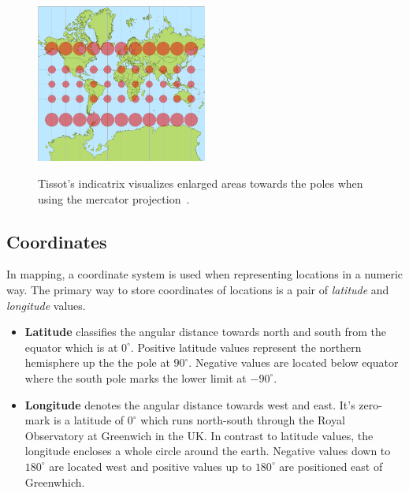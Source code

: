 \begin{figure}[h]
  \begin{center}
    \includegraphics[width=0.5\textwidth]{figures/tissot_mercator.png}
    \label{fig:mercator}
    \caption{Tissot's indicatrix visualizes enlarged areas towards the poles when using the mercator projection~\cite{wiki:mercator}.}
  \end{center}
\end{figure}


\subsection{Coordinates}

In mapping, a coordinate system is used when representing locations in a numeric way. The primary way to store coordinates of locations is a pair of \textit{latitude} and \textit{longitude} values. 

\begin{itemize}

\item \textbf{Latitude} classifies the angular distance towards north and south from the equator which is at $0^\circ$. Positive latitude values represent the northern hemisphere up the the pole at $90^\circ$. Negative values are located below equator where the south pole marks the lower limit at $-90^\circ$.

\item \textbf{Longitude} denotes the angular distance towards west and east. It's zero-mark is a latitude of $0^\circ$  which runs north-south through the Royal Observatory at Greenwich in the UK. In contrast to latitude values, the longitude encloses a whole circle around the earth. Negative values down to $180^\circ$ are located west and positive values up to $180^\circ$ are positioned east of Greenwhich.

\end{itemize}

